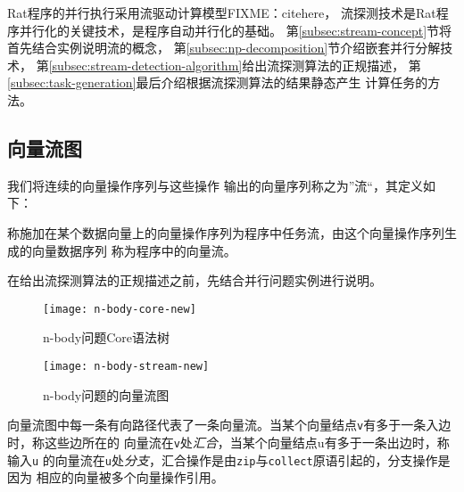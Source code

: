 Rat程序的并行执行采用流驱动计算模型FIXME：citehere，
流探测技术是Rat程序并行化的关键技术，是程序自动并行化的基础。
第\ref{subsec:stream-concept}节将首先结合实例说明流的概念，
第\ref{subsec:np-decomposition}节介绍嵌套并行分解技术，
第\ref{subsec:stream-detection-algorithm}给出流探测算法的正规描述，
第\ref{subsec:task-generation}最后介绍根据流探测算法的结果静态产生
计算任务的方法。


\subsection{向量流图}
我们将连续的向量操作序列与这些操作
输出的向量序列称之为”流“，其定义如下：
\begin{definition}
  称施加在某个数据向量上的向量操作序列为程序中任务流，由这个向量操作序列生成的向量数据序列
  称为程序中的向量流。
\end{definition}

在给出流探测算法的正规描述之前，先结合并行问题实例进行说明。
\begin{quotation}
\end{quotation}
\begin{figure}
  \centering
  \texttt{[image: n-body-core-new]}
  \caption{n-body问题Core语法树}
  \label{fig:n-body-core}
\end{figure}
\begin{figure}
  \centering
  \texttt{[image: n-body-stream-new]}
  \caption{n-body问题的向量流图}
  \label{fig:n-body-stream}
\end{figure}

向量流图中每一条有向路径代表了一条向量流。当某个向量结点\texttt{v}有多于一条入边时，称这些边所在的
向量流在\texttt{v}处\emph{汇合}，当某个向量结点u有多于一条出边时，称输入\texttt{u}
的向量流在\texttt{u}处\emph{分支}，汇合操作是由\texttt{zip}与\texttt{collect}原语引起的，分支操作是因为
相应的向量被多个向量操作引用。

